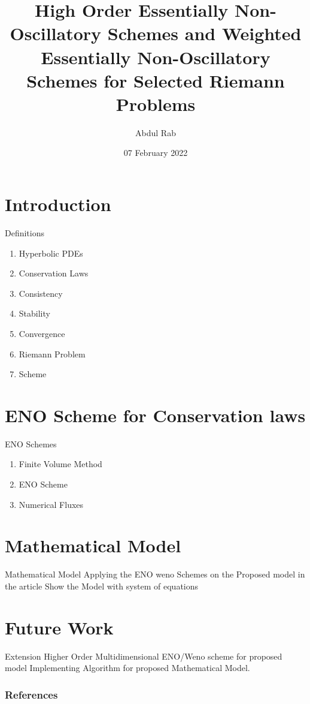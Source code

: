 \documentclass{beamer}
\title{High Order Essentially Non-Oscillatory Schemes and Weighted Essentially Non-Oscillatory Schemes for Selected Riemann Problems}
\author[Abdul Rab]{Abdul Rab\\[10mm]}
\institute{Sukkur IBA University}
\date{07 February 2022}
\begin{document}
 
\frame{\titlepage} 

\section{Introduction}

\begin{frame}{Definitions}
    \begin{enumerate}
        \item Hyperbolic PDEs
        \item Conservation Laws
        \item Consistency
        \item Stability
        \item Convergence
        \item Riemann Problem
        \item Scheme
    \end{enumerate}
\end{frame}


\section{ENO Scheme for Conservation laws}
\begin{frame}{ENO Schemes}
\begin{enumerate}
    \item Finite Volume Method
    \item ENO Scheme
    \item Numerical Fluxes
\end{enumerate}
\end{frame}

\section{Mathematical Model}
\begin{frame}{Mathematical Model}
    Applying the ENO weno Schemes on the Proposed model in the article
    Show the Model with system of equations
\end{frame}


\section{Future Work}
\begin{frame}{Extension}
    Higher Order Multidimensional ENO/Weno scheme for proposed model
    Implementing Algorithm for proposed Mathematical Model.
\end{frame}


\begin{frame}[allowframebreaks]
        \frametitle{References}
        
        
\end{frame}
\end{document}
